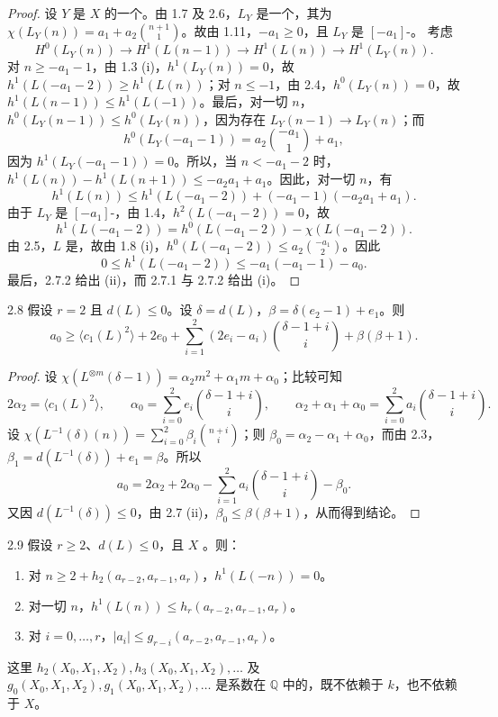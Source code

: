 \begin{proof}
设 $Y$ 是 $X$ 的一个。由 1.7 及 2.6，$L_Y$ 是一个，其为 $\chi(L_Y(n))=a_1+a_2\binom{n+1}{1}$。故由 1.11，$-a_1\geq0$，且 $L_Y$ 是 $[-a_1]$-。
考虑
\[H^0(L_Y(n))\longrightarrow H^1(L(n-1))\longrightarrow H^1(L(n))\longrightarrow H^1(L_Y(n)).\]
对 $n\geq-a_1-1$，由 1.3 (i)，$h^1(L_Y(n))=0$，故 $h^1(L(-a_1-2))\geq h^1(L(n))$；对 $n\leq-1$，由 2.4，$h^0(L_Y(n))=0$，故 $h^1(L(n-1))\leq h^1(L(-1))$。最后，对一切 $n$，$h^0(L_Y(n-1))\leq h^0(L_Y(n))$，因为存在 $L_Y(n-1)\to L_Y(n)$；而
\[h^0(L_Y(-a_1-1))=a_2\binom{-a_1}{1}+a_1,\]
因为 $h^1(L_Y(-a_1-1))=0$。所以，当 $n<-a_1-2$ 时，$h^1(L(n))-h^1(L(n+1))\leq-a_2a_1+a_1$。因此，对一切 $n$，有
\[h^1(L(n))\leq h^1(L(-a_1-2))+(-a_1-1)(-a_2a_1+a_1).\tag{2.7.1}\]
由于 $L_Y$ 是 $[-a_1]$-，由 1.4，$h^2(L(-a_1-2))=0$，故
\[h^1(L(-a_1-2))=h^0(L(-a_1-2))-\chi(L(-a_1-2)).\]
由 2.5，$L$ 是，故由 1.8 (i)，$h^0(L(-a_1-2))\leq a_2\binom{-a_1}{2}$。因此
\[0\leq h^1(L(-a_1-2))\leq -a_1(-a_1-1)-a_0.\tag{2.7.2}\]
最后，2.7.2 给出 (ii)，而 2.7.1 与 2.7.2 给出 (i)。
\end{proof}
\begin{SGAresult}{}{2.8}
假设 $r=2$ 且 $d(L)\leq0$。设 $\delta=d(L)$，$\beta=\delta(e_2-1)+e_1$。则
\[a_0\geq\langle c_1(L)^2\rangle+2e_0+\sum_{i=1}^2(2e_i-a_i)\binom{\delta-1+i}{i}+\beta(\beta+1).\]
\end{SGAresult}
\begin{proof}
设 $\chi(L^{\otimes m}(\delta-1))=\alpha_2m^2+\alpha_1m+\alpha_0$；比较可知
\[2\alpha_2=\langle c_1(L)^2\rangle,\qquad
\alpha_0=\sum_{i=0}^2e_i\binom{\delta-1+i}{i},\qquad
\alpha_2+\alpha_1+\alpha_0=\sum_{i=0}^2a_i\binom{\delta-1+i}{i}.\]
设 $\chi(L^{-1}(\delta)(n))=\sum_{i=0}^2\beta_i\binom{n+i}{i}$；则 $\beta_0=\alpha_2-\alpha_1+\alpha_0$，而由 2.3，$\beta_1=d(L^{-1}(\delta))+e_1=\beta$。所以
\[a_0=2\alpha_2+2\alpha_0-\sum_{i=1}^2a_i\binom{\delta-1+i}{i}-\beta_0.\]
又因 $d(L^{-1}(\delta))\leq0$，由 2.7 (ii)，$\beta_0\leq\beta(\beta+1)$，从而得到结论。
\end{proof}
\begin{SGAresult}{}{2.9}
假设 $r\geq2$、$d(L)\leq0$，且 $X$ 。则：
\begin{enumerate}
\item[(i)] 对 $n\geq2+h_2(a_{r-2},a_{r-1},a_r)$，$h^1(L(-n))=0$。
\item[(ii)] 对一切 $n$，$h^1(L(n))\leq h_r(a_{r-2},a_{r-1},a_r)$。
\item[(iii)] 对 $i=0,\ldots,r$，$|a_i|\leq g_{r-i}(a_{r-2},a_{r-1},a_r)$。
\end{enumerate}
这里 $h_2(X_0,X_1,X_2),h_3(X_0,X_1,X_2),\ldots$ 及 $g_0(X_0,X_1,X_2),g_1(X_0,X_1,X_2),\ldots$ 是系数在 $\mathbb Q$ 中的，既不依赖于 $k$，也不依赖于 $X$。
\end{SGAresult}

